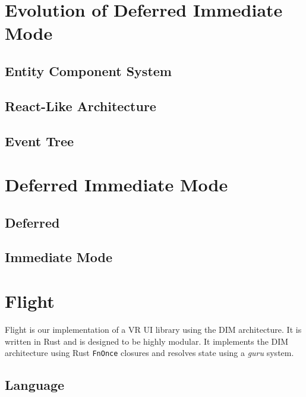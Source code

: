 \documentclass[conference,12pt]{IEEEtran}
\begin{document}
\section{Evolution of Deferred Immediate Mode}

\subsection{Entity Component System}

\subsection{React-Like Architecture}

\subsection{Event Tree}

\section{Deferred Immediate Mode}

\subsection{Deferred}

\subsection{Immediate Mode}

\section{Flight}
Flight is our implementation of a VR UI library using the DIM architecture. It
is written in Rust and is designed to be highly modular. It implements the DIM
architecture using Rust \texttt{FnOnce} closures and resolves state using a
\textit{guru} system.

\subsection{Language}
\end{document}

